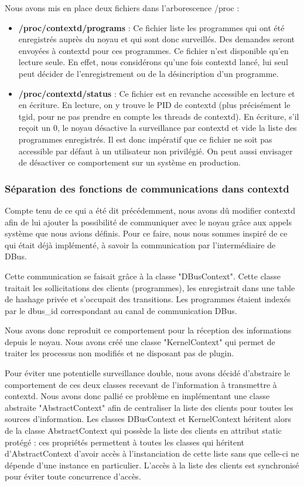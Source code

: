 \documentclass[pdftex,a4paper,titlepage,11pt]{article}
\begin{document}
Nous avons mis en place deux fichiers dans l'arborescence /proc :

	\begin{itemize}
		\item \textbf{/proc/contextd/programs} : Ce fichier liste les programmes qui ont été enregistrés auprès du noyau et qui sont donc surveillés. Des demandes seront envoyées à contextd pour ces programmes. Ce fichier n'est disponible qu'en lecture seule. En effet, nous considérons qu'une fois contextd lancé, lui seul peut décider de l'enregistrement ou de la désincription d'un programme.
		\item \textbf{/proc/contextd/status} : Ce fichier est en revanche accessible en lecture et en écriture. En lecture, on y trouve le PID de contextd (plus précisément le tgid, pour ne pas prendre en compte les threads de contextd). En écriture, s'il reçoit un 0, le noyau désactive la surveillance par contextd et vide la liste des programmes enregistrés. Il est donc impératif que ce fichier ne soit pas accessible par défaut à un utilisateur non privilégié. On peut aussi envisager de désactiver ce comportement sur un système en production.
	\end{itemize}

\subsubsection{Séparation des fonctions de communications dans contextd}

Compte tenu de ce qui a été dit précédemment, nous avons dû modifier contextd afin de lui ajouter la possibilité de communiquer avec le noyau grâce aux appels système que nous avions définis. Pour ce faire, nous nous sommes inspiré de ce qui était déjà implémenté, à savoir la communication par l'intermédiaire de DBus.

Cette communication se faisait grâce à la classe "DBusContext". Cette classe traitait les sollicitations des clients (programmes), les enregistrait dans une table de hashage privée et s'occupait des transitions. Les programmes étaient indexés par le dbus\_id correspondant au canal de communication DBus.

Nous avons donc reproduit ce comportement pour la réception des informations depuis le noyau. Nous avons créé une classe "KernelContext" qui permet de traiter les processus non modifiés et ne disposant pas de plugin.

Pour éviter une potentielle surveillance double, nous avons décidé d'abstraire le comportement de ces deux classes recevant de l'information à transmettre à contextd. Nous avons donc pallié ce problème en implémentant une classe abstraite "AbstractContext" afin de centraliser la liste des clients pour toutes les sources d'information. Les classes DBusContext et KernelContext héritent alors de la classe AbstractContext qui possède la liste des clients en attribut static protégé : ces propriétés permettent à toutes les classes qui héritent d'AbstractContext d'avoir accès à l'instanciation de cette liste sans que celle-ci ne dépende d'une instance en particulier. L'accès à la liste des clients est synchronisé pour éviter toute concurrence d'accès.
\end{document}
